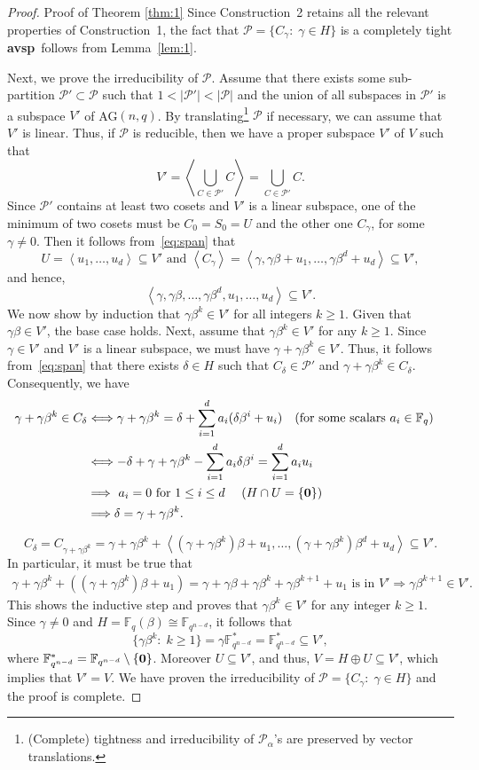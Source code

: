 \documentclass[11pt]{amsart}
\def \P{{\mathcal P}}
\def \ra{\right\rangle}
\def \la{\left\langle}
\def \ga{\gamma}
\def \al{\alpha}
\def \be{\beta}
\def \de{\delta}
\def \F{{\mathbb F}}
\def \avsp{\mbox{\bf avsp}}
\def \o{\mbox{\bf 0} }
\begin{document}
\begin{proof}{Proof of Theorem \ref{thm:1}}
Since Construction~2 retains all the relevant properties of Construction~1, the fact that $\P=\{C_{\ga}:\; \ga\in H\}$ is a completely tight \avsp~follows from Lemma~\ref{lem:1}.

Next, we prove the irreducibility of $\P$. Assume that there exists some sub-partition $\P'\subset \P$ such that $1<|\P'|<|\P|$ and the union of all subspaces in $\P'$ is a subspace $V'$ of AG$(n,q)$. 
By translating\footnote{(Complete) tightness and irreducibility of $\P_\al$'s are preserved by vector translations.} $\P$ if necessary, we can assume that $V'$ is linear. Thus, if $\P$ is reducible, then we have a proper subspace $V'$ of $V$ such that
%
\begin{equation}\label{eq:span}
V'=\la \bigcup_{C\in \P'} C\ra=\bigcup_{C\in \P'} C.
\end{equation}
%
Since $\P'$ contains at least two cosets and $V'$ is a linear subspace,  one of the minimum of two cosets must be $C_{0}=S_0=U$ and the other one $C_{\ga}$, for some $\ga\not=0$.
Then it follows from~\eqref{eq:span} that
\[U=\la u_1, \ldots, u_d\ra \subseteq V'\mbox{ and } \la C_{\ga}\ra = \la \ga, \ga\be+u_1,\ldots,\ga\be^d+u_d\ra\subseteq V',\]
and hence,
 \[\la \ga,\ga\be,\ldots,\ga\be^d, u_1, \ldots, u_d\ra \subseteq V'.\]
 We now show by induction that $\ga \be^k\in V'$ for all integers $k\geq1$.
Given that $\ga \be\in V'$, the base case holds. Next, assume that $\ga \be^k\in V'$ for any $k\geq1$. Since $\ga\in V'$ and $V'$ is a linear subspace, we must have $\ga+\ga \be^k\in V'$. Thus, 
it follows from~\eqref{eq:span} that there exists $\de\in H$ such that  $C_\de\in\P'$ and $\ga+\ga \be^k \in C_\de$. Consequently, we have
%
\begin{align*}\label{eq:cond1}
\ga+\ga \be^k \in C_\de 
& \Longleftrightarrow 
\ga+\ga \be^k = \de+\sum_{i=1}^d a_i (\de\be^i+u_i) \quad \mbox{(for some scalars $a_i\in \F_q$)}\cr 
& \Longleftrightarrow 
-\de+\ga+\ga \be^k -\sum_{i=1}^d a_i \de\be^i=\sum_{i=1}^d a_i u_i  \cr 
& \Longrightarrow 
 \mbox{ $a_i=0$ for $1\leq i\leq d$ } \quad (H\cap U=\{ \o\}) 
 \cr
 & \Longrightarrow 
\de=\ga+\ga \be^k.
\end{align*}
%

 \[C_\de= C_{\ga+\ga \be^k}=\ga+\ga \be^k+ \la (\ga+\ga \be^k)\be+u_1,\ldots,(\ga+\ga \be^k)\be^d+u_d\ra \subseteq V'.\]
In particular,  it must be true that
%
\begin{align}\label{eq:cond2}
\ga+\ga \be^k+\left((\ga+\ga \be^k)\be+u_1\right) =
\ga+\ga\be+\ga \be^k+\ga \be^{k+1}+u_1 \mbox{ is in } V'\Longrightarrow \ga \be^{k+1}\in V' .
\end{align}
%
This shows the inductive step and proves that $\ga \be^k\in V' $ for any integer $k\geq 1$.
Since $\ga\not=0$ and $H=\F_q(\beta) \cong \F_{q^{n-d}}$, it follows that 
\[\{\ga \be^k:\; k\geq 1\}=\ga\F_{q^{n-d}}^*=\F_{q^{n-d}}^*\subseteq V',\]
where $\F_{q^{n-d}}^*=\F_{q^{n-d}}\setminus\{\o\}$. 
Moreover $U\subseteq V'$, and thus, $V=H\oplus U\subseteq V'$, which implies that $V'=V$. We have proven the irreducibility of $\P=\{C_\ga:\; \ga\in H\}$ and the proof is complete.
\end{proof} 
\end{document}
